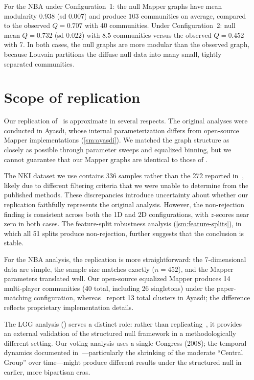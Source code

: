 \documentclass[hidelinks]{siamart251216}
\begin{document}
For the NBA under Configuration~1: the null Mapper graphs have mean
modularity $0.938$ (sd $0.007$) and produce $103$ communities on average,
compared to the observed $Q = 0.707$ with 40 communities.  Under
Configuration~2: null mean $Q = 0.732$ (sd $0.022$) with $8.5$
communities versus the observed $Q = 0.452$ with 7.  In both cases, the
null graphs are more modular than the observed graph, because Louvain
partitions the diffuse null data into many small, tightly separated
communities.


\section{Scope of replication}\label{sm:replication-scope}

Our replication of~\cite{Lum2013} is approximate in several respects.
The original analyses were conducted in Ayasdi, whose internal
parameterization differs from open-source Mapper implementations
(\cref{sm:ayasdi}).  We matched the graph structure as closely as
possible through parameter sweeps and equalized binning, but we cannot
guarantee that our Mapper graphs are identical to those of
\cite{Lum2013}.

The NKI dataset we use contains 336 samples rather than the 272 reported
in~\cite{Lum2013}, likely due to different filtering criteria that we
were unable to determine from the published methods.  These discrepancies
introduce uncertainty about whether our replication faithfully represents
the original analysis.  However, the non-rejection finding is consistent
across both the 1D and 2D configurations, with $z$-scores near zero in
both cases.  The feature-split robustness analysis
(\cref{sm:feature-splits}), in which all 51 splits produce
non-rejection, further suggests that the conclusion is stable.

For the NBA analysis, the replication is more straightforward: the
7-dimensional data are simple, the sample size matches exactly
($n = 452$), and the Mapper parameters translated well.  Our open-source
equalized Mapper produces 14 multi-player communities (40 total,
including 26 singletons) under the paper-matching configuration,
whereas~\cite{Lum2013} report 13 total clusters in Ayasdi; the
difference reflects proprietary implementation details.

The LGG analysis (\citealp{RabadanCamara2020}) serves a distinct role:
rather than replicating~\cite{Lum2013}, it provides an external
validation of the structured null framework in a methodologically
different setting.  Our voting analysis uses a single Congress (2008);
the temporal dynamics documented in~\cite{Lum2013}---particularly the
shrinking of the moderate ``Central Group'' over time---might produce
different results under the structured null in earlier, more bipartisan
eras.
\end{document}
